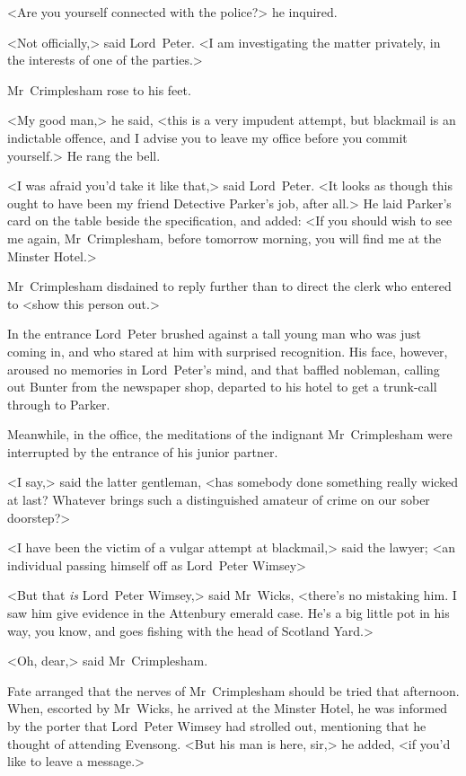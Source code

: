 <Are you yourself connected with the police?> he inquired.

<Not officially,> said Lord~Peter. <I am investigating the matter privately, in the interests of one of the parties.>

Mr~Crimplesham rose to his feet.

<My good man,> he said, <this is a very impudent attempt, but blackmail is an indictable offence, and I advise you to leave my office before you commit yourself.> He rang the bell.

<I was afraid you'd take it like that,> said Lord~Peter. <It looks as though this ought to have been my friend Detective Parker's job, after all.> He laid Parker's card on the table beside the specification, and added: <If you should wish to see me again, Mr~Crimplesham, before tomorrow morning, you will find me at the Minster Hotel.>

Mr~Crimplesham disdained to reply further than to direct the clerk who entered to <show this person out.>

In the entrance Lord~Peter brushed against a tall young man who was just coming in, and who stared at him with surprised recognition. His face, however, aroused no memories in Lord~Peter's mind, and that baffled nobleman, calling out Bunter from the newspaper shop, departed to his hotel to get a trunk-call through to Parker.

Meanwhile, in the office, the meditations of the indignant Mr~Crimplesham were interrupted by the entrance of his junior partner.

<I say,> said the latter gentleman, <has somebody done something really wicked at last? Whatever brings such a distinguished amateur of crime on our sober doorstep?>

<I have been the victim of a vulgar attempt at blackmail,> said the lawyer; <an individual passing himself off as Lord~Peter Wimsey\longdash>

<But that \emph{is} Lord~Peter Wimsey,> said Mr~Wicks, <there's no mistaking him. I saw him give evidence in the Attenbury emerald case. He's a big little pot in his way, you know, and goes fishing with the head of Scotland Yard.>

<Oh, dear,> said Mr~Crimplesham.

Fate arranged that the nerves of Mr~Crimplesham should be tried that afternoon. When, escorted by Mr~Wicks, he arrived at the Minster Hotel, he was informed by the porter that Lord~Peter Wimsey had strolled out, mentioning that he thought of attending Evensong. <But his man is here, sir,> he added, <if you'd like to leave a message.>

